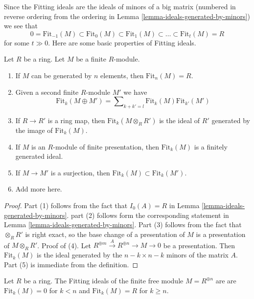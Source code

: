 \noindent
Since the Fitting ideals are the ideals of minors of a big matrix
(numbered in reverse ordering from the ordering in
Lemma \ref{lemma-ideals-generated-by-minors})
we see that
$$
0 = \text{Fit}_{-1}(M) \subset \text{Fit}_0(M) \subset \text{Fit}_1(M)
\subset \ldots \subset \text{Fit}_t(M) = R
$$
for some $t \gg 0$. Here are some basic properties of Fitting ideals.

\begin{lemma}
\label{lemma-fitting-ideal-basics}
Let $R$ be a ring. Let $M$ be a finite $R$-module.
\begin{enumerate}
\item If $M$ can be generated by $n$ elements, then
$\text{Fit}_n(M) = R$.
\item Given a second finite $R$-module $M'$ we have
$$
\text{Fit}_k(M \oplus M') =
\sum\nolimits_{k + k' = l} \text{Fit}_k(M)\text{Fit}_{k'}(M')
$$
\item If $R \to R'$ is a ring map, then $\text{Fit}_k(M \otimes_R R')$
is the ideal of $R'$ generated by the image of $\text{Fit}_k(M)$.
\item If $M$ is an $R$-module of finite presentation, then $\text{Fit}_k(M)$
is a finitely generated ideal.
\item If $M \to M'$ is a surjection, then
$\text{Fit}_k(M) \subset \text{Fit}_k(M')$.
\item Add more here.
\end{enumerate}
\end{lemma}

\begin{proof}
Part (1) follows from the fact that $I_0(A) = R$ in
Lemma \ref{lemma-ideals-generated-by-minors}.
part (2) follows form the corresponding statement in
Lemma \ref{lemma-ideals-generated-by-minors}.
Part (3) follows from the fact that $\otimes_R R'$ is right exact,
so the base change of a presentation of $M$ is a presentation of
$M \otimes_R R'$.
Proof of (4). Let $R^{\oplus m} \xrightarrow{A} R^{\oplus n} \to M \to 0$
be a presentation. Then $\text{Fit}_k(M)$ is the ideal generated by the
$n - k \times n - k$ minors of the matrix $A$.
Part (5) is immediate from the definition.
\end{proof}

\begin{example}
\label{example-fitting-free}
Let $R$ be a ring.
The Fitting ideals of the finite free module $M = R^{\oplus n}$ are
are $\text{Fit}_k(M) = 0$ for $k < n$ and $\text{Fit}_k(M) = R$
for $k \geq n$.
\end{example}

